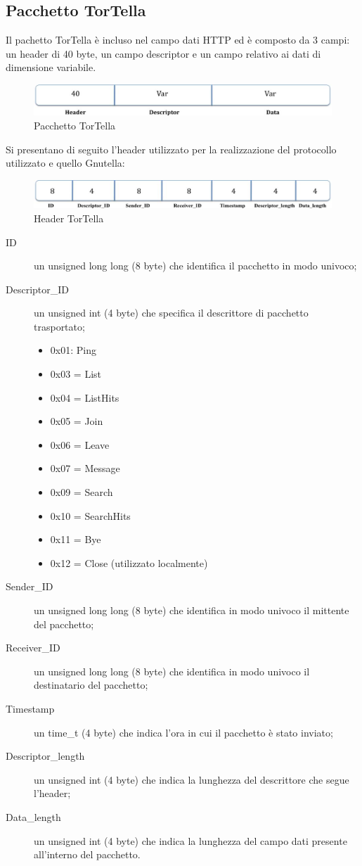 \subsection{Pacchetto TorTella}
Il pachetto TorTella è incluso nel campo dati HTTP ed è composto da 3 campi: un header di 40 byte, un campo descriptor e un campo relativo ai dati di dimensione variabile.
\begin{figure}[htb]
\begin{center}
\includegraphics[scale=0.38]{etc/tortellapacket.jpg}
\caption{Pacchetto TorTella}
\label{tortellapacket}
\end{center}
\end{figure}
Si presentano di seguito l’header utilizzato per la realizzazione del protocollo utilizzato e quello Gnutella:
\begin{figure}[htb]
\begin{center}
\includegraphics[scale=0.38]{etc/tortellaheader.jpg}
\caption{Header TorTella}
\label{tortellaheader}
\end{center}
\end{figure}
\begin{description}
\item[ID] un unsigned long long (8 byte) che identifica il pacchetto in modo univoco;
\item[Descriptor\_ID] un unsigned int (4 byte) che specifica il descrittore di pacchetto trasportato;
\begin{itemize}
	\item 0x01: Ping
	\item 0x03 = List
	\item 0x04 = ListHits
	\item 0x05 = Join
	\item 0x06 = Leave
	\item 0x07 = Message
	\item 0x09 = Search
	\item 0x10 = SearchHits
	\item 0x11 = Bye
	\item 0x12 = Close (utilizzato localmente)
\end{itemize}
\item[Sender\_ID] un unsigned long long (8 byte) che identifica in modo univoco il mittente del pacchetto;
\item[Receiver\_ID] un unsigned long long (8 byte) che identifica in modo univoco il destinatario del pacchetto;
\item[Timestamp] un time\_t (4 byte) che indica l’ora in cui il pacchetto è stato inviato;
\item[Descriptor\_length] un unsigned int (4 byte) che indica la lunghezza del descrittore che segue l’header;
\item[Data\_length] un unsigned int (4 byte) che indica la lunghezza del campo dati presente all’interno del pacchetto.
\end{description}
